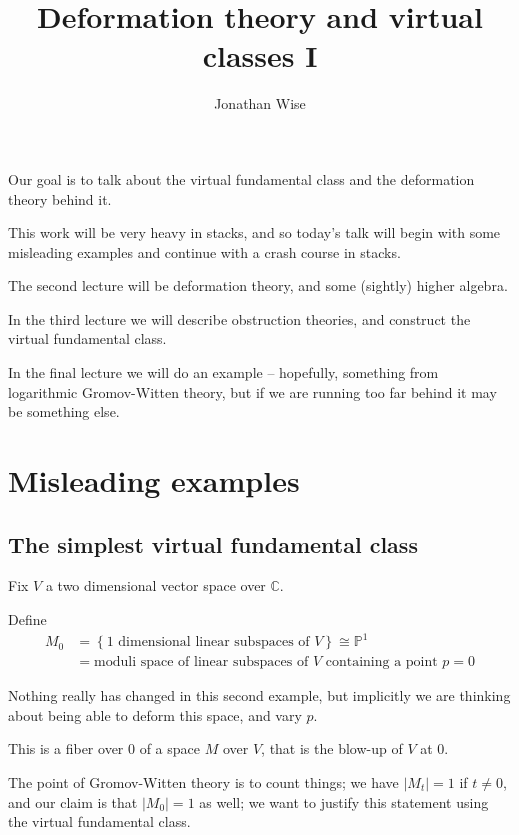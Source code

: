 \documentclass{amsart}
\author{Jonathan Wise}
\title{Deformation theory and virtual classes I}
\theoremstyle{definition}
\newcommand{\proj}{\mathbb{P}}
\newcommand{\C}{\mathbb{C}}
\begin{document}
\maketitle

Our goal is to talk about the virtual fundamental class and the deformation theory behind it.

This work will be very heavy in stacks, and so today's talk will begin with some misleading examples and continue with a crash course in stacks.

The second lecture will be deformation theory, and some (sightly) higher algebra.

In the third lecture we will describe obstruction theories, and construct the virtual fundamental class.

In the final lecture we will do an example -- hopefully, something from logarithmic Gromov-Witten theory, but if we are running too far behind it may be something else.


\section{Misleading examples}

\subsection{The simplest virtual fundamental class}

Fix $V$ a two dimensional vector space over $\C$.

Define 
\begin{align*}
M_0&=\left\{\text{1 dimensional linear subspaces of $V$}\right\}\cong \proj^1\\
&=\text{moduli space of linear subspaces of $V$ containing a point $p=0$}
\end{align*}

Nothing really has changed in this second example, but implicitly we are thinking about being able to deform this space, and vary $p$.

This is a fiber over $0$ of a space $M$ over $V$, that is the blow-up of $V$ at 0.

\begin{tikzpicture}

\end{tikzpicture}
The point of Gromov-Witten theory is to count things; we have $|M_t|=1$ if $t\neq 0$, and our claim is that $|M_0|=1$ as well; we want to justify this statement using the virtual fundamental class.
\end{document}

